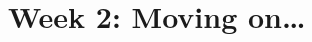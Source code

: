 \documentclass[11pt,a4paper]{book}
\begin{document}
%
\chapter{Week 2: Moving on\ldots}


\end{document}
